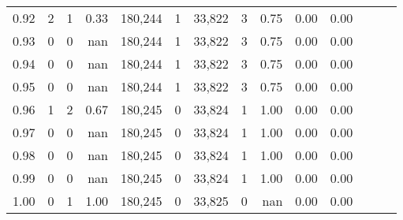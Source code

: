 \begin{tabular}{rrrrrrrrrrrrrr}
0.92 &      2 &      1 &  0.33 &  180,244 &        1 &  33,822 &       3 &  0.75 &  0.00 &      0.00 \\
0.93 &      0 &      0 &   nan &  180,244 &        1 &  33,822 &       3 &  0.75 &  0.00 &      0.00 \\
0.94 &      0 &      0 &   nan &  180,244 &        1 &  33,822 &       3 &  0.75 &  0.00 &      0.00 \\
0.95 &      0 &      0 &   nan &  180,244 &        1 &  33,822 &       3 &  0.75 &  0.00 &      0.00 \\
0.96 &      1 &      2 &  0.67 &  180,245 &        0 &  33,824 &       1 &  1.00 &  0.00 &      0.00 \\
0.97 &      0 &      0 &   nan &  180,245 &        0 &  33,824 &       1 &  1.00 &  0.00 &      0.00 \\
0.98 &      0 &      0 &   nan &  180,245 &        0 &  33,824 &       1 &  1.00 &  0.00 &      0.00 \\
0.99 &      0 &      0 &   nan &  180,245 &        0 &  33,824 &       1 &  1.00 &  0.00 &      0.00 \\
1.00 &      0 &      1 &  1.00 &  180,245 &        0 &  33,825 &       0 &   nan &  0.00 &      0.00 \\
\bottomrule
\end{tabular}
